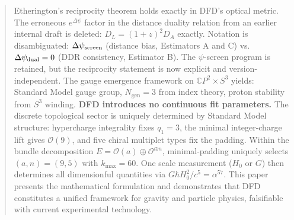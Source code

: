 \documentclass[aps,prd,twocolumn,superscriptaddress,showpacs,floatfix,nofootinbib]{revtex4-2}
\theoremstyle{plain}
\theoremstyle{definition}
\theoremstyle{remark}
\begin{document}
\begin{abstract}
Etherington's reciprocity theorem holds exactly in DFD's optical metric.
The erroneous $e^{\Delta\psi}$ factor in the distance duality relation from an earlier internal draft
is deleted: $D_L = (1+z)^2 D_A$ exactly. Notation is disambiguated: $\Delta\psi_{\rm screen}$
(distance bias, Estimators A and C) vs.\ $\Delta\psi_{\rm dual} = 0$ (DDR consistency, Estimator B).
The $\psi$-screen program is retained, but the reciprocity statement is now explicit and version-independent.
%
The gauge emergence framework on $\mathbb{C}P^2 \times S^3$ yields: Standard Model gauge group, 
$N_{\text{gen}} = 3$ from index theory, proton stability from $S^3$ winding.
%
\textbf{DFD introduces no continuous fit parameters.} The discrete topological sector is uniquely 
determined by Standard Model structure: hypercharge integrality fixes $q_1 = 3$, 
the minimal integer-charge lift gives $\mathcal{O}(9)$, and five chiral multiplet types fix the padding. 
Within the bundle decomposition $E = \mathcal{O}(a) \oplus \mathcal{O}^{\oplus n}$, minimal-padding uniquely selects 
$(a,n) = (9,5)$ with $k_{\max} = 60$. One scale measurement ($H_0$ or $G$) then determines all 
dimensionful quantities via $G\hbar H_0^2/c^5 = \alpha^{57}$.
This paper presents the mathematical formulation and demonstrates that 
DFD constitutes a unified framework for gravity and particle physics, falsifiable with 
current experimental technology.
\end{abstract}

\maketitle
\tableofcontents







\end{document}
